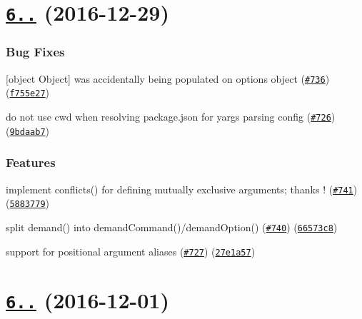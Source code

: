 \label{_6.6.0}%
 \section*{\href{https://github.com/yargs/yargs/compare/v6.5.0...v6.6.0}{\tt 6..} (2016-\/12-\/29)}

\subsubsection*{Bug Fixes}


\begin{DoxyItemize}
\item \mbox{[}object Object\mbox{]} was accidentally being populated on options object (\href{https://github.com/yargs/yargs/issues/736}{\tt \#736}) (\href{https://github.com/yargs/yargs/commit/f755e27}{\tt f755e27})
\item do not use cwd when resolving package.\+json for yargs parsing config (\href{https://github.com/yargs/yargs/issues/726}{\tt \#726}) (\href{https://github.com/yargs/yargs/commit/9bdaab7}{\tt 9bdaab7})
\end{DoxyItemize}

\subsubsection*{Features}


\begin{DoxyItemize}
\item implement conflicts() for defining mutually exclusive arguments; thanks \href{https://github.com/madcampos}{\tt }! (\href{https://github.com/yargs/yargs/issues/741}{\tt \#741}) (\href{https://github.com/yargs/yargs/commit/5883779}{\tt 5883779})
\item split demand() into demand\+Command()/demand\+Option() (\href{https://github.com/yargs/yargs/issues/740}{\tt \#740}) (\href{https://github.com/yargs/yargs/commit/66573c8}{\tt 66573c8})
\item support for positional argument aliases (\href{https://github.com/yargs/yargs/issues/727}{\tt \#727}) (\href{https://github.com/yargs/yargs/commit/27e1a57}{\tt 27e1a57})
\end{DoxyItemize}

\label{_6.5.0}%
 \section*{\href{https://github.com/yargs/yargs/compare/v6.4.0...v6.5.0}{\tt 6..} (2016-\/12-\/01)}

